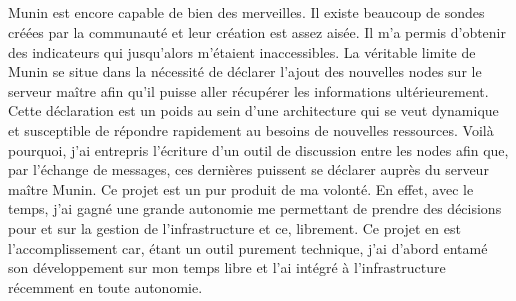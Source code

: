\documentclass[11pt, a4paper ]{article}
\begin{document}
\begin{spacing}{1.5}
\subparagraph{}
Munin est encore capable de bien des merveilles. Il existe beaucoup de sondes créées par la communauté et leur création est assez aisée. Il m'a permis d'obtenir des indicateurs qui jusqu'alors m'étaient inaccessibles.
La véritable limite de Munin se situe dans la nécessité de déclarer l'ajout des nouvelles nodes sur le serveur maître afin qu'il puisse aller récupérer les informations ultérieurement. Cette déclaration est un poids au sein d'une architecture qui se veut dynamique et susceptible de répondre rapidement au besoins de nouvelles ressources. Voilà pourquoi, j'ai entrepris l'écriture d'un outil de discussion entre les nodes afin que, par l'échange de messages, ces dernières puissent se déclarer auprès du serveur maître Munin. Ce projet est un pur produit de ma volonté. En effet, avec le temps, j'ai gagné une grande autonomie me permettant de prendre des décisions pour et sur la gestion de l'infrastructure et ce, librement. Ce projet en est l'accomplissement car, étant un outil purement technique, j'ai d'abord entamé son développement sur mon temps libre et l'ai intégré à l'infrastructure récemment en toute autonomie.





\end{spacing}
\end{document}

